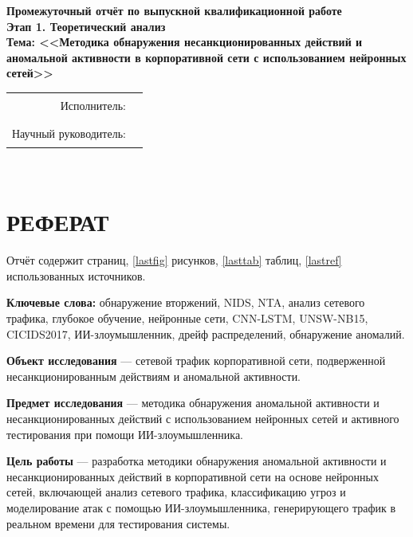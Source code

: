 \documentclass[14pt, a4paper]{extarticle}
\begin{document}
\begin{titlepage}
\centering
\vspace*{1cm}

{\large\bfseries Промежуточный отчёт по выпускной квалификационной работе}\\[0.3cm]
{\large\bfseries Этап 1. Теоретический анализ}\\[2cm]

{\Large\bfseries Тема: <<Методика обнаружения несанкционированных действий
и аномальной активности в корпоративной сети с использованием нейронных
сетей>>}\\[3cm]

\begin{flushright}
\begin{tabular}{rl}
Исполнитель: & \rule{6cm}{0.4pt} \\[0.3cm]
Научный руководитель: & \rule{6cm}{0.4pt} \\
\end{tabular}
\end{flushright}

\vfill
{\large \the\year}\\
\end{titlepage}

\section*{РЕФЕРАТ}

Отчёт содержит \pageref{LastPage} страниц,
\ref{lastfig} рисунков, \ref{lasttab} таблиц,
\ref{lastref} использованных источников.

\textbf{Ключевые слова:} обнаружение вторжений, NIDS, NTA,
анализ сетевого трафика, глубокое обучение, нейронные сети, CNN-LSTM,
UNSW-NB15, CICIDS2017, ИИ-злоумышленник, дрейф распределений,
обнаружение аномалий.

\textbf{Объект исследования} --- сетевой трафик корпоративной сети,
подверженной несанкционированным действиям и аномальной активности.

\textbf{Предмет исследования} --- методика обнаружения аномальной
активности и несанкционированных действий с использованием нейронных
сетей и активного тестирования при помощи ИИ-злоумышленника.

\textbf{Цель работы} --- разработка методики обнаружения аномальной
активности и несанкционированных действий в корпоративной сети на основе
нейронных сетей, включающей анализ сетевого трафика, классификацию угроз
и моделирование атак с помощью ИИ-злоумышленника, генерирующего трафик
в реальном времени для тестирования системы.
\end{document}
